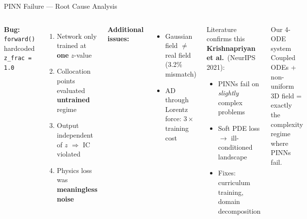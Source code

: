 \documentclass[aspectratio=169, 11pt]{beamer}
\begin{document}
\begin{frame}{PINN Failure --- Root Cause Analysis}
  \begin{columns}[T]
    \textbf{Bug:} \texttt{forward()} hardcoded \texttt{z\_frac = 1.0}
    \begin{enumerate}\setlength{\itemsep}{1pt}
      \item Network only trained at \textbf{one} $z$-value
      \item Collocation points evaluated \textbf{untrained} regime
      \item Output independent of $z$ $\Rightarrow$ IC violated
      \item Physics loss was \textbf{meaningless noise}
    \end{enumerate}

    \smallskip
    \textbf{Additional issues:}
    \begin{itemize}\setlength{\itemsep}{1pt}
      \item Gaussian field $\neq$ real field (3.2\% mismatch)
      \item AD through Lorentz force: $3{\times}$ training cost
    \end{itemize}

    \begin{alertblock}{Literature confirms this}
      \textbf{Krishnapriyan et al.}\ (NeurIPS 2021):
      \begin{itemize}\setlength{\itemsep}{1pt}
        \item PINNs fail on \emph{slightly} complex problems
        \item Soft PDE loss $\to$ ill-conditioned landscape
        \item Fixes: curriculum training, domain decomposition
      \end{itemize}
    \end{alertblock}

    \begin{exampleblock}{Our 4-ODE system}
      Coupled ODEs + non-uniform 3D field = exactly the complexity regime where PINNs fail.
    \end{exampleblock}
  \end{columns}
\end{frame}
\end{document}
